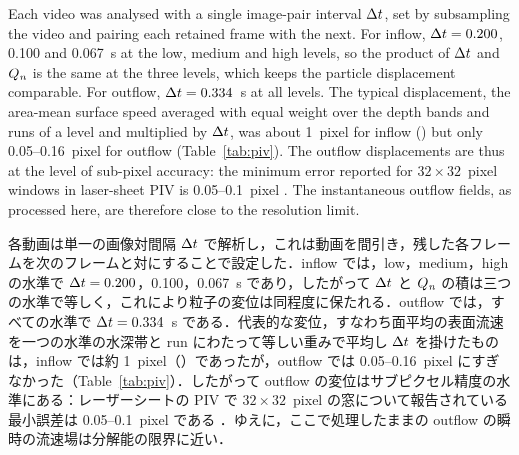 \begin{en}[M4-3]
Each video was analysed with a single image-pair interval $\Delta t$, set by subsampling the video and pairing each retained frame with the next. For inflow, $\Delta t = 0.200$, 0.100 and 0.067~s at the low, medium and high levels, so the product of $\Delta t$ and $Q_{\mathit{n}}$ is the same at the three levels, which keeps the particle displacement comparable. For outflow, $\Delta t = 0.334$~s at all levels. The typical displacement, the area-mean surface speed averaged with equal weight over the depth bands and runs of a level and multiplied by $\Delta t$, was about 1~pixel for inflow () but only 0.05--0.16~pixel for outflow (Table~\ref{tab:piv}). The outflow displacements are thus at the level of sub-pixel accuracy: the minimum error reported for $32 \times 32$~pixel windows in laser-sheet PIV is 0.05--0.1~pixel \citep{sciacchitanoUncertaintyQuantificationParticle2019}. The instantaneous outflow fields, as processed here, are therefore close to the resolution limit.
\end{en}
\begin{ja}
各動画は単一の画像対間隔 $\Delta t$ で解析し，これは動画を間引き，残した各フレームを次のフレームと対にすることで設定した．inflow では，low，medium，high の水準で $\Delta t = 0.200$，0.100，0.067~s であり，したがって $\Delta t$ と $Q_{\mathit{n}}$ の積は三つの水準で等しく，これにより粒子の変位は同程度に保たれる．outflow では，すべての水準で $\Delta t = 0.334$~s である．代表的な変位，すなわち面平均の表面流速を一つの水準の水深帯と run にわたって等しい重みで平均し $\Delta t$ を掛けたものは，inflow では約 1~pixel（）であったが，outflow では 0.05--0.16~pixel にすぎなかった（Table~\ref{tab:piv}）．したがって outflow の変位はサブピクセル精度の水準にある：レーザーシートの PIV で $32 \times 32$~pixel の窓について報告されている最小誤差は 0.05--0.1~pixel である \citep{sciacchitanoUncertaintyQuantificationParticle2019}．ゆえに，ここで処理したままの outflow の瞬時の流速場は分解能の限界に近い．
\end{ja}

